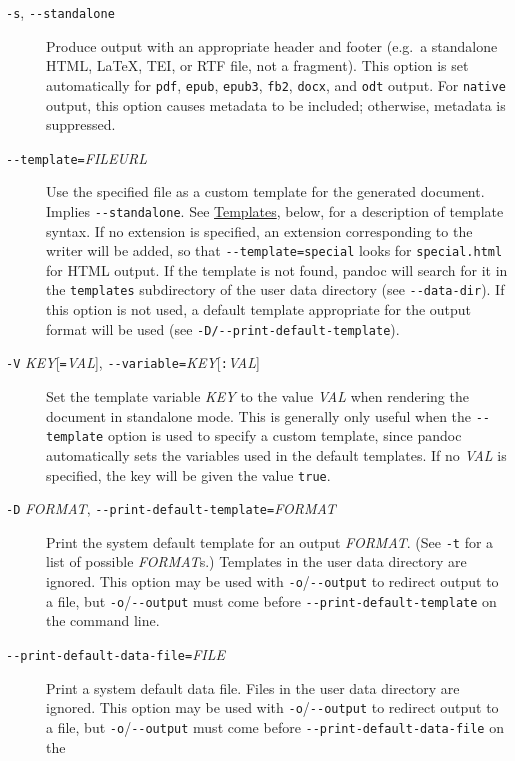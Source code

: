 \documentclass[
  12pt,
  a4paper,
]{article}
\begin{document}
\begin{description}
\item[\texttt{-s}, \texttt{-\/-standalone}]
Produce output with an appropriate header and footer (e.g.~a standalone HTML, LaTeX, TEI, or RTF
file, not a fragment). This option is set automatically for \texttt{pdf}, \texttt{epub},
\texttt{epub3}, \texttt{fb2}, \texttt{docx}, and \texttt{odt} output. For \texttt{native} output,
this option causes metadata to be included; otherwise, metadata is suppressed.
\item[\texttt{-\/-template=}\emph{FILE}\textbar{}\emph{URL}]
Use the specified file as a custom template for the generated document. Implies
\texttt{-\/-standalone}. See \protect\hyperlink{templates}{Templates}, below, for a description of
template syntax. If no extension is specified, an extension corresponding to the writer will be
added, so that \texttt{-\/-template=special} looks for \texttt{special.html} for HTML output. If
the template is not found, pandoc will search for it in the \texttt{templates} subdirectory of the
user data directory (see \texttt{-\/-data-dir}). If this option is not used, a default template
appropriate for the output format will be used (see \texttt{-D/-\/-print-default-template}).
\item[\texttt{-V} \emph{KEY}{[}\texttt{=}\emph{VAL}{]},
\texttt{-\/-variable=}\emph{KEY}{[}\texttt{:}\emph{VAL}{]}]
Set the template variable \emph{KEY} to the value \emph{VAL} when rendering the document in
standalone mode. This is generally only useful when the \texttt{-\/-template} option is used to
specify a custom template, since pandoc automatically sets the variables used in the default
templates. If no \emph{VAL} is specified, the key will be given the value \texttt{true}.
\item[\texttt{-D} \emph{FORMAT}, \texttt{-\/-print-default-template=}\emph{FORMAT}]
Print the system default template for an output \emph{FORMAT}. (See \texttt{-t} for a list of
possible \emph{FORMAT}s.) Templates in the user data directory are ignored. This option may be
used with \texttt{-o}/\texttt{-\/-output} to redirect output to a file, but
\texttt{-o}/\texttt{-\/-output} must come before \texttt{-\/-print-default-template} on the
command line.
\item[\texttt{-\/-print-default-data-file=}\emph{FILE}]
Print a system default data file. Files in the user data directory are ignored. This option may be
used with \texttt{-o}/\texttt{-\/-output} to redirect output to a file, but
\texttt{-o}/\texttt{-\/-output} must come before \texttt{-\/-print-default-data-file} on the

\end{description}
\end{document}
